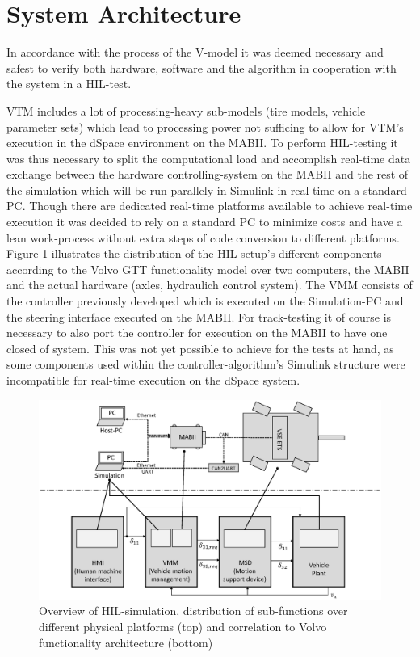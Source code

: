\documentclass[root.tex]{subfiles}
\begin{document}
{\pagestyle{empty}}
\section{System Architecture}
\label{chap:HiL-Architecture}

In accordance with the process of the V-model it was deemed necessary and safest to verify both hardware, software and the algorithm in cooperation with the system in a \gls{HIL}-test. 

\gls{VTM} includes a lot of processing-heavy sub-models (tire models, vehicle parameter sets) which lead to processing power not sufficing to allow for \gls{VTM}'s execution in the dSpace environment on the \gls{MABII}. To perform \gls{HIL}-testing it was thus necessary to split the computational load and accomplish real-time data exchange between the hardware controlling-system on the \gls{MABII} and the rest of the simulation which will be run parallely in Simulink in real-time on a standard PC. Though there are dedicated real-time platforms available to achieve real-time execution it was decided to rely on a standard PC to minimize costs and have a lean work-process without extra steps of code conversion to different platforms. Figure \ref{fig:HIL_overview} illustrates the distribution of the \gls{HIL}-setup's different components according to the Volvo GTT functionality model over two computers, the \gls{MABII} and the actual hardware (axles, hydraulich control system). The \gls{VMM} consists of the controller previously developed which is executed on the Simulation-PC and the steering interface executed on the \gls{MABII}. For track-testing it of course is necessary to also port the controller for execution on the \gls{MABII} to have one closed of system. This was not yet possible to achieve for the tests at hand, as some components used within the controller-algorithm's  Simulink structure were incompatible for real-time execution on the dSpace system.

\begin{figure}[h]
	\centering
	\includegraphics[width=0.8\linewidth]{HIL_overview}
	\caption[Overview of \acrlong{HIL}-simulation, distribution of sub-functions over different physical platforms (top) and correlation to Volvo functionality architecture (bottom)]{Overview of \gls{HIL}-simulation, distribution of sub-functions over different physical platforms (top) and correlation to Volvo functionality architecture (bottom)}
	
	\label{fig:HIL_overview}
\end{figure}
\end{document}
